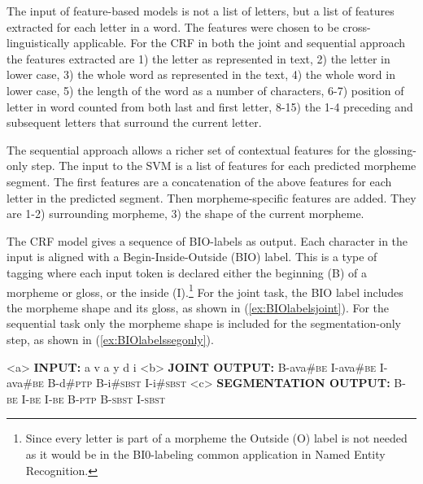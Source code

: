 The input of feature-based models is not a list of letters, but a list of features extracted for each letter in a word. The features were chosen to be cross-linguistically applicable. For the CRF in both the joint and sequential approach the features extracted are 1) the letter as represented in text, 2) the letter in lower case, 3) the whole word as represented in the text, 4) the whole word in lower case, 5) the length of the word as a number of characters, 6-7) position of letter in word counted from both last and first letter, 8-15) the 1-4 preceding and subsequent letters that surround the current letter. 

The sequential approach allows a richer set of contextual features for the glossing-only step. The input to the SVM is a list of features for each predicted morpheme segment. The first features are a concatenation of the above features for each letter in the predicted segment. Then morpheme-specific features are added. They are 1-2) surrounding morpheme, 3) the shape of the current morpheme. 

The CRF model gives a sequence of BIO-labels \citep{ramshaw1999} as output. Each character in the input is aligned with a Begin-Inside-Outside (BIO) label. This is a type of tagging where each input token is declared either the beginning (B) of a morpheme or gloss, or the inside (I).\footnote{Since every letter is part of a morpheme the Outside (O) label is not needed as it would be in the BI0-labeling common application in Named Entity Recognition.} For the joint task, the BIO label includes the morpheme shape and its gloss, as shown in (\ref{ex:BIOlabelsjoint}). For the sequential task only the morpheme shape is included for the segmentation-only step, as shown in (\ref{ex:BIOlabelssegonly}). 

\pex   
\label{ex:BIOlabels}
\a<a> {\bf INPUT:} \hspace{3 mm}  a \hspace{2 mm}  v \hspace{2 mm} a \hspace{2 mm} y \hspace{2 mm} d \hspace{2 mm} i
\a<b> {\bf JOINT OUTPUT:} \hspace{.5 mm} B-ava\#\textsc{be} \hspace{.5 mm} I-ava\#\textsc{be}  \hspace{.5 mm} I-ava\#\textsc{be} \hspace{1 mm} B-d\#\textsc{ptp}  \hspace{.5 mm}B-i\#\textsc{sbst}  \hspace{.5 mm} I-i\#\textsc{sbst}
\label{ex:BIOlabelsjoint}
\a<c> {\bf SEGMENTATION OUTPUT:} \hspace{1 mm} B-\textsc{be} \hspace{1 mm} I-\textsc{be} \hspace{1 mm} I-\textsc{be} \hspace{1 mm} B-\textsc{ptp} \hspace{1 mm} B-\textsc{sbst} \hspace{1 mm} I-\textsc{sbst}
\label{ex:BIOlabelssegonly}
\xe


